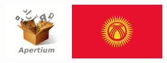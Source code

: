 \documentclass[a0paper,landscape,fontscale=0.285]{baposter}
\begin{document}
\begin{poster}
{			%

		}{
			{\begin{minipage}{19em}
				\hfill
				\includegraphics[height=6.5em]{apertium}
				\includegraphics[height=6.5em]{flagkg1}
			\end{minipage}}
		}


\end{poster}
\end{document}
